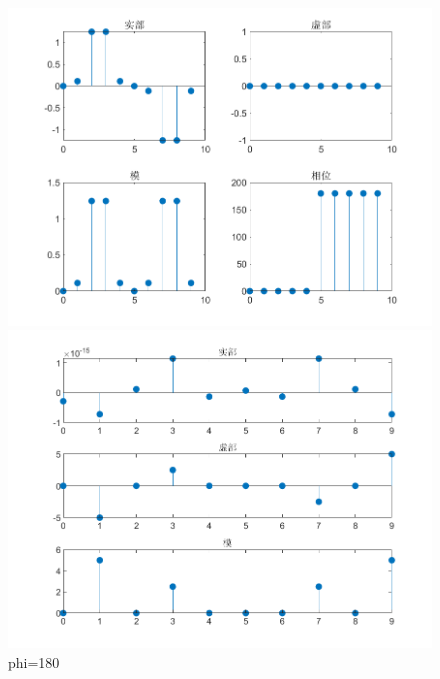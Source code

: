 \documentclass{../source/zjureport}
\begin{document}
                 

                \begin{figure}[H]
                    \centering
                    \begin{minipage}[t]{0.48\textwidth}
                    \centering
                    \includegraphics[width=\textwidth]{figure/复合函数序列_phi=180.png}
                    \end{minipage}
                    \begin{minipage}[t]{0.48\textwidth}
                    \centering
                    \includegraphics[width=\textwidth]{figure/频谱_复合函数序列_phi=180.png}
                    \end{minipage}
                    \caption{phi=180}
                \end{figure}
\end{document}
